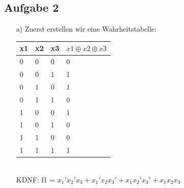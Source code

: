 \documentclass{scrartcl}
\begin{document}
	\subsection*{Aufgabe 2}
	\begin{itemize}
		\item[a)] Zuerst erstellen wir eine Wahrheitstabelle:\\
		\begin{table}[h]
			\begin{tabular}{l|l|l|l}
				x1 & x2 & x3 & $x1\oplus x2\oplus x3$ \\ \hline
				0  & 0  & 0  & 0 \\
				0  & 0  & 1  & 1 \\
				0  & 1  & 0  & 1 \\
				0  & 1  & 1  & 0 \\
				1  & 0  & 0  & 1 \\
				1  & 0  & 1  & 0 \\
				1  & 1  & 0  & 0 \\
				1  & 1  & 1  & 1 \hfill
			\end{tabular}
		\end{table}\\
		KDNF: f1 = $x_{1}'x_{2}'x_{3} + x_{1}'x_{2}x_{3}' + x_{1}x_{2}'x_{3}' + x_{1}x_{2}x_{3}$
		

\end{itemize}
\end{document}
